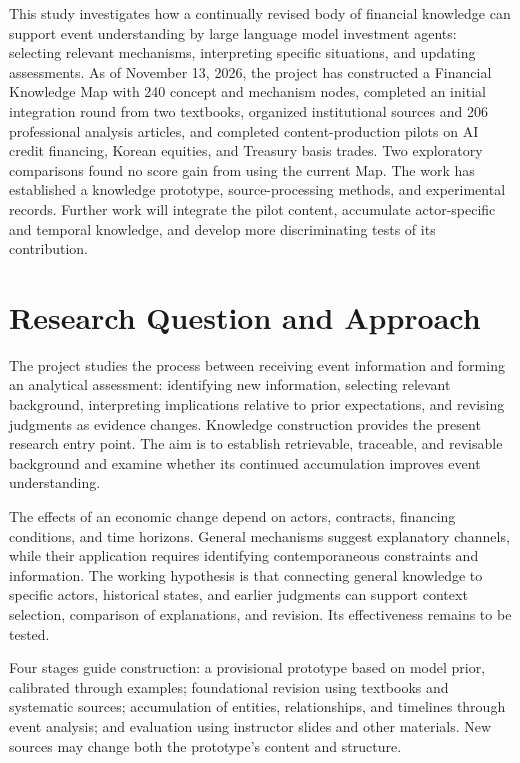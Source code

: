 \documentclass[11pt,letterpaper]{article}
\begin{document}
\reporttitle

This study investigates how a continually revised body of financial knowledge can support event understanding by large language model investment agents: selecting relevant mechanisms, interpreting specific situations, and updating assessments. As of November 13, 2026, the project has constructed a Financial Knowledge Map with 240 concept and mechanism nodes, completed an initial integration round from two textbooks, organized institutional sources and 206 professional analysis articles, and completed content-production pilots on AI credit financing, Korean equities, and Treasury basis trades. Two exploratory comparisons found no score gain from using the current Map. The work has established a knowledge prototype, source-processing methods, and experimental records. Further work will integrate the pilot content, accumulate actor-specific and temporal knowledge, and develop more discriminating tests of its contribution.

\section{Research Question and Approach}

The project studies the process between receiving event information and forming an analytical assessment: identifying new information, selecting relevant background, interpreting implications relative to prior expectations, and revising judgments as evidence changes. Knowledge construction provides the present research entry point. The aim is to establish retrievable, traceable, and revisable background and examine whether its continued accumulation improves event understanding.

The effects of an economic change depend on actors, contracts, financing conditions, and time horizons. General mechanisms suggest explanatory channels, while their application requires identifying contemporaneous constraints and information. The working hypothesis is that connecting general knowledge to specific actors, historical states, and earlier judgments can support context selection, comparison of explanations, and revision. Its effectiveness remains to be tested.

Four stages guide construction: a provisional prototype based on model prior, calibrated through examples; foundational revision using textbooks and systematic sources; accumulation of entities, relationships, and timelines through event analysis; and evaluation using instructor slides and other materials. New sources may change both the prototype's content and structure.
\end{document}
